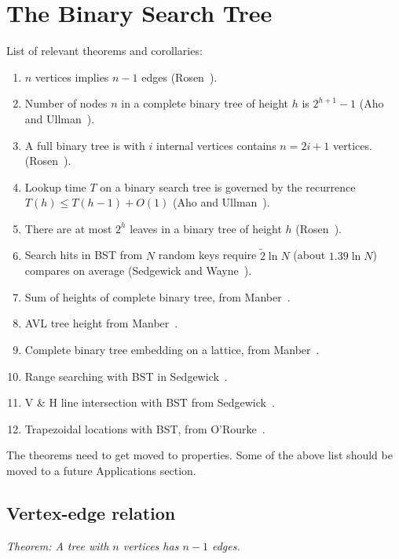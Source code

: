 \section{The Binary Search Tree}

List of relevant theorems and corollaries:

\begin{enumerate}
  \item $n$ vertices implies $n-1$ edges (Rosen~\cite[p. 752]{rosen}).
  \item Number of nodes $n$ in a complete binary tree of height $h$ is $2^{h+1} - 1$
    (Aho and Ullman~\cite[p. 257]{aho:av:1992}).
  \item A full binary tree is with $i$ internal vertices contains $n = 2i + 1$ vertices.
    (Rosen~\cite[p. 752]{rosen}).
  \item Lookup time $T$ on a binary search tree is governed by the recurrence
    $T(h) \leq T(h-1) + O(1)$ (Aho and Ullman~\cite[p. 256]{aho:av:1992}).
  \item There are at most $2^h$ leaves in a binary tree of height $h$ (Rosen~\cite[p. 754]{rosen}).
  \item Search hits in BST from $N$ random keys require $\tilde2\ln N$ (about $1.39\ln N$) compares
    on average (Sedgewick and Wayne~\cite[p. 403]{sedgewick:r2011}).
  \item Sum of heights of complete binary tree, from Manber~\cite[p. 34]{manber:u1989}.
  \item AVL tree height from Manber~\cite[p. 75]{manber:u1989}.
  \item Complete binary tree embedding on a lattice, from Manber~\cite[p. 263]{manber:u1989}.
  \item Range searching with BST in Sedgewick~\cite[p. 373]{sedgewick:r1990}.
  \item V \& H line intersection with BST from Sedgewick~\cite[p. 391]{sedgewick:r1990}.
  \item Trapezoidal locations with BST, from O'Rourke~\cite[p. 289]{orourke:j1998}.
\end{enumerate}

The theorems need to get moved to properties. Some of the above list should be
moved to a future Applications section.

\subsection{Vertex-edge relation}

\textit{Theorem: A tree with $n$ vertices has $n-1$ edges.}

